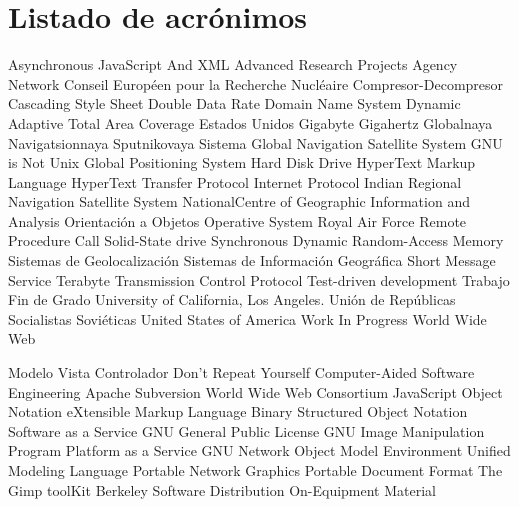 \chapter{Listado de acrónimos}

{\small
\begin{acronym}[XXXXXXXX]
	         {Asynchronous JavaScript And XML}
	        {Advanced Research Projects Agency Network}
	           {Conseil Européen pour la Recherche Nucléaire}
	          {Compresor-Decompresor}		  
	            {Cascading Style Sheet}
	            {Double Data Rate}
	            {Domain Name System}
	        {Dynamic Adaptive Total Area Coverage}
	         {Estados Unidos}
	             {Gigabyte}
	            {Gigahertz}
	        {Globalnaya Navigatsionnaya Sputnikovaya Sistema}
	           {Global Navigation Satellite System}
	            {\acs{GNU} is Not Unix}
	            {Global Positioning System}
	            {Hard Disk Drive}
	           {HyperText Markup Language}
	           {HyperText Transfer Protocol}
	             {Internet Protocol}
	          {Indian Regional Navigation Satellite System}
	          {NationalCentre of Geographic Information and Analysis}
	             {Orientación a Objetos}
	             {Operative System}
	            {Royal Air Force}
	            {Remote Procedure Call}
	            {Solid-State drive}
	          {Synchronous Dynamic Random-Access Memory}
	             {Sistemas de Geolocalización}
	            {Sistemas de Información Geográfica}
	            {Short Message Service}
	             {Terabyte}
	            {Transmission Control Protocol}
	            {Test-driven development}
	            {Trabajo Fin de Grado}
	           {University of California, Los Angeles}.
	           {Unión de Repúblicas Socialistas Soviéticas}
	            {United States of America}
	            {Work In Progress}
	            {World Wide Web}
	
			{Modelo Vista Controlador}
			{Don't Repeat Yourself}
			{Computer-Aided Software Engineering}
			{Apache Subversion}
			{World Wide Web Consortium}
			{JavaScript Object Notation}
			{eXtensible Markup Language}
			{Binary Structured Object Notation}
			{Software as a Service}
			{\acs{GNU} General Public License}
			{\acs{GNU} Image Manipulation Program} 
			{Platform as a Service}
		{GNU Network Object Model Environment}
			{Unified Modeling Language}
			{Portable Network Graphics}
			{Portable Document Format}
			{The Gimp toolKit}
			{Berkeley Software Distribution}
			{On-Equipment Material}
\end{acronym}
}


